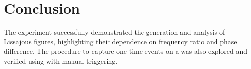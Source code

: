 \documentclass[a4paper,12pt]{article}
\begin{document}
\section*{Conclusion}
The experiment successfully demonstrated the generation and analysis of Lissajous figures, highlighting their dependence on frequency ratio and phase difference. The procedure to capture one-time events on a  was also explored and verified using  with manual triggering.
\end{document}
